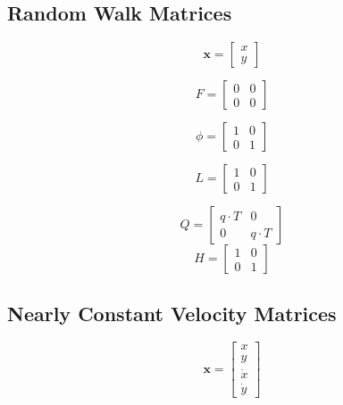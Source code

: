 \documentclass[9pt]{IEEEtran}
\begin{document}
\clearpage
{\maketitle}
\appendix
\subsection*{Random Walk Matrices}
\begin{equation}
    \textbf{x} = \begin{bmatrix}
    x\\
    y
    \end{bmatrix}
\end{equation}
    


\begin{equation}
    F = \begin{bmatrix}
    0 & 0  \\
    0 & 0
    \end{bmatrix}
\end{equation}

\begin{equation}
    \phi = \begin{bmatrix}
    1 & 0\\
    0 & 1
    \end{bmatrix}
\end{equation}

\begin{equation}
    L = \begin{bmatrix}
    1 & 0 \\
    0 & 1
    \end{bmatrix}
\end{equation}

\begin{equation}
    Q = \begin{bmatrix}
    q \cdot T & 0\\
    0 & q \cdot T
    \end{bmatrix}
\end{equation}
\begin{equation}
    H = \begin{bmatrix}
    1 & 0 \\
    0 & 1
    \end{bmatrix}
\end{equation}


\subsection*{Nearly Constant Velocity Matrices} %
\begin{equation}
    \textbf{x} = \begin{bmatrix}
    x\\
    y\\
    \dot{x}\\
    \dot{y}
    \end{bmatrix}
    \end{equation}
\end{document}
